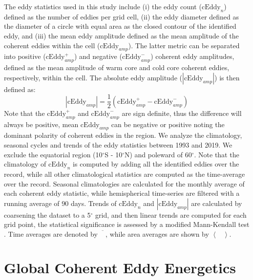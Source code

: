\documentclass[draft,linenumbers]{agujournal2019}
\providecommand{\DIFadd}[1]{{\protect\color{blue}\uwave{#1}}} %
\providecommand{\DIFaddbegin}{} %
\providecommand{\DIFaddend}{} %
\begin{document}
	The eddy statistics used in this study include (i) the eddy count ($\mathrm{cEddy}_{n}$) defined as the number of eddies per grid cell, (ii) the eddy diameter defined as the diameter of a circle with equal area as the closed contour of the identified eddy, and (iii) the mean eddy amplitude defined as the mean amplitude of the coherent eddies within the cell ($\mathrm{cEddy}_{amp}$). The latter metric can be separated into positive ($\mathrm{cEddy}_{amp}^{+}$) and negative ($\mathrm{cEddy}_{amp}^{-}$) coherent eddy amplitudes, defined as the mean amplitude of warm core and cold core coherent eddies, respectively, within the cell. 
	The absolute eddy amplitude ($|\mathrm{cEddy}_{amp}|$) is then defined as:
	\begin{equation}
	|\mathrm{cEddy}_{amp}| = \frac{1}{2} \left(\mathrm{cEddy}_{amp}^{+} -  \mathrm{cEddy}_{amp}^{-} \right)
	\end{equation}
	Note that the $\mathrm{cEddy}_{amp}^{+}$ and $\mathrm{cEddy}_{amp}^{-}$ are sign definite, thus the difference will always be positive, mean $\mathrm{cEddy}_{amp}$ can be negative or positive noting the dominant polarity of coherent eddies in the region. We analyze the climatology, seasonal cycles and trends of the eddy statistics between 1993 and 2019. We exclude the equatorial region (10$^\circ$S - 10$^\circ$N) and poleward of 60$^\circ$. Note that the climatology of $\mathrm{cEddy}_{n}$ is computed by adding all the identified eddies over the record, while all other climatological statistics are computed as the time-average over the record.  Seasonal climatologies are calculated for the monthly average of each coherent eddy statistic, while hemispherical time-series are filtered with a running average of 90 days. Trends of $\mathrm{cEddy}_{n}$ and $|\mathrm{cEddy}_{amp}|$ are calculated by coarsening the dataset to a 5$^\circ$ grid, and then linear trends are computed for each grid point, the statistical significance is assessed by a modified Mann-Kendall test \citep{Sheng_MK_2004}. Time averages are denoted by $\overline{\phantom{X}}$, while \DIFaddbegin \DIFadd{time and }\DIFaddend area averages are shown by $\left< \phantom{X}\right>$.

	\section{Global Coherent Eddy Energetics}
	\label{sec:CEKE_climatology}

\end{document}
